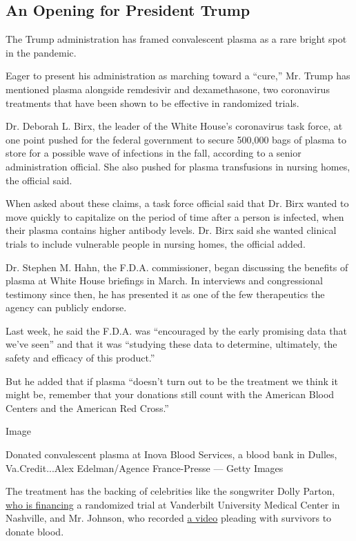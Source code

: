 \hypertarget{an-opening-for-president-trump}{%
\subsection{An Opening for President
Trump}\label{an-opening-for-president-trump}}

The Trump administration has framed convalescent plasma as a rare bright
spot in the pandemic.

Eager to present his administration as marching toward a ``cure,'' Mr.
Trump has mentioned plasma alongside remdesivir and dexamethasone, two
coronavirus treatments that have been shown to be effective in
randomized trials.

Dr. Deborah L. Birx, the leader of the White House's coronavirus task
force, at one point pushed for the federal government to secure 500,000
bags of plasma to store for a possible wave of infections in the fall,
according to a senior administration official. She also pushed for
plasma transfusions in nursing homes, the official said.

When asked about these claims, a task force official said that Dr. Birx
wanted to move quickly to capitalize on the period of time after a
person is infected, when their plasma contains higher antibody levels.
Dr. Birx said she wanted clinical trials to include vulnerable people in
nursing homes, the official added.

Dr. Stephen M. Hahn, the F.D.A. commissioner, began discussing the
benefits of plasma at White House briefings in March. In interviews and
congressional testimony since then, he has presented it as one of the
few therapeutics the agency can publicly endorse.

Last week, he said the F.D.A. was ``encouraged by the early promising
data that we've seen'' and that it was ``studying these data to
determine, ultimately, the safety and efficacy of this product.''

But he added that if plasma ``doesn't turn out to be the treatment we
think it might be, remember that your donations still count with the
American Blood Centers and the American Red Cross.''

Image

Donated convalescent plasma at Inova Blood Services, a blood bank in
Dulles, Va.Credit...Alex Edelman/Agence France-Presse --- Getty Images

The treatment has the backing of celebrities like the songwriter Dolly
Parton,
\href{https://clinicaltrials.gov/ct2/show/NCT04362176?term=convalescent+plasma\&type=Intr\&cond=COVID\&intr=randomized\&draw=2\&rank=9}{who
is financing} a randomized trial at Vanderbilt University Medical Center
in Nashville, and Mr. Johnson, who recorded
\href{https://www.youtube.com/watch?v=DYpmJcAdp2E}{a video} pleading
with survivors to donate blood.

